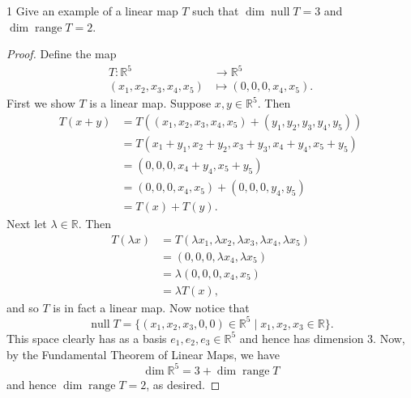 \documentclass{extarticle}
\newenvironment{problem}[1]{\begin{prob*}{#1}{}}{\end{prob*}}
\newcommand{\R}{\mathbb{R}}
\DeclareMathOperator{\Null}{null}
\DeclareMathOperator{\Range}{range}
\begin{document}
\begin{problem}{1}
Give an example of a linear map $T$ such that $\dim\Null T = 3$ and $\dim\Range T = 2$.
\end{problem}
\begin{proof}
Define the map
\begin{align*}
T:\R^5 &\to \R^5\\
  (x_1, x_2, x_3,x_4, x_5) &\mapsto (0, 0, 0, x_4, x_5).
\end{align*}
First we show $T$ is a linear map.  Suppose $x,y\in\R^5$.  Then
\begin{align*}
T(x + y) &= T((x_1, x_2, x_3,x_4, x_5) + (y_1, y_2, y_3,y_4, y_5) )\\
&= T(x_1+y_1, x_2+y_2, x_3+y_3,x_4+y_4, x_5+y_5)\\
&= (0, 0, 0, x_4 + y_4, x_5 + y_5)\\
&= (0, 0, 0, x_4, x_5) + (0, 0, 0, y_4, y_5)\\
&= T(x) + T(y).
\end{align*}
Next let $\lambda\in\R$.  Then
\begin{align*}
T(\lambda x) &= T(\lambda x_1, \lambda x_2, \lambda x_3, \lambda x_4, \lambda x_5) \\
&= (0, 0, 0, \lambda x_4, \lambda x_5)\\
&= \lambda(0,0,0,x_4, x_5)\\
&= \lambda T(x),
\end{align*}
and so $T$ is in fact a linear map.  Now notice that
\begin{equation*}
\Null T = \{(x_1,x_2,x_3,0,0)\in\R^5\mid x_1, x_2, x_3\in\R\}.
\end{equation*}  
This space clearly has as a basis $e_1,e_2,e_3\in\R^5$ and hence has dimension $3$.  Now, by the Fundamental Theorem of Linear Maps, we have 
\begin{equation*}
\dim\R^5 = 3 + \dim\Range T
\end{equation*}
and hence $\dim\Range T = 2$, as desired.
\end{proof}
\end{document}
